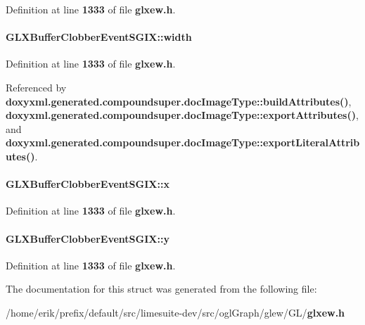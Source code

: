 Definition at line {\bf 1333} of file {\bf glxew.\+h}.

\paragraph[{width}]{ G\+L\+X\+Buffer\+Clobber\+Event\+S\+G\+I\+X\+::width}\label{structGLXBufferClobberEventSGIX_adad23535733161528427584a42bfc6eb}


Definition at line {\bf 1333} of file {\bf glxew.\+h}.



Referenced by {\bf doxyxml.\+generated.\+compoundsuper.\+doc\+Image\+Type\+::build\+Attributes()}, {\bf doxyxml.\+generated.\+compoundsuper.\+doc\+Image\+Type\+::export\+Attributes()}, and {\bf doxyxml.\+generated.\+compoundsuper.\+doc\+Image\+Type\+::export\+Literal\+Attributes()}.

\paragraph[{x}]{ G\+L\+X\+Buffer\+Clobber\+Event\+S\+G\+I\+X\+::x}\label{structGLXBufferClobberEventSGIX_a5118d48c3c8d5253d39922b5014b52ff}


Definition at line {\bf 1333} of file {\bf glxew.\+h}.

\paragraph[{y}]{ G\+L\+X\+Buffer\+Clobber\+Event\+S\+G\+I\+X\+::y}\label{structGLXBufferClobberEventSGIX_aef21efa11558a5b67861f96471c56003}


Definition at line {\bf 1333} of file {\bf glxew.\+h}.



The documentation for this struct was generated from the following file\+:\begin{DoxyCompactItemize}
\item 
/home/erik/prefix/default/src/limesuite-\/dev/src/ogl\+Graph/glew/\+G\+L/{\bf glxew.\+h}\end{DoxyCompactItemize}
